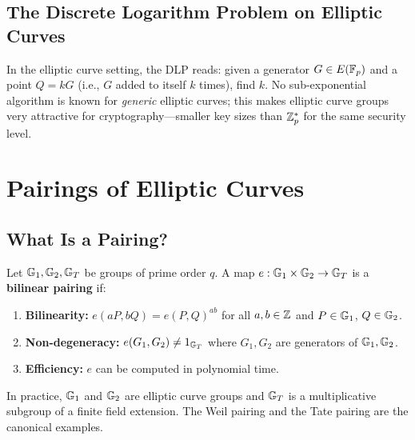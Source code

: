 \documentclass[11pt]{article}
\begin{document}
\subsection{The Discrete Logarithm Problem on Elliptic Curves}

In the elliptic curve setting, the DLP reads: given a generator
$G \in E(\mathbb{F}_p)$ and a point $Q = kG$ (i.e., $G$ added to itself $k$
times), find $k$.  No sub-exponential algorithm is known for
\emph{generic} elliptic curves; this makes elliptic curve groups very
attractive for cryptography---smaller key sizes than $\mathbb{Z}_p^*$ for the
same security level.

\section{Pairings of Elliptic Curves}

\subsection{What Is a Pairing?}

\begin{definition}
  Let $\mathbb{G}_1, \mathbb{G}_2, \mathbb{G}_T$ be groups of prime order $q$.  A map
  $e : \mathbb{G}_1 \times \mathbb{G}_2 \to \mathbb{G}_T$ is a \textbf{bilinear pairing} if:
  \begin{enumerate}[label=(\roman*)]
    \item \textbf{Bilinearity:} $e(aP, bQ) = e(P,Q)^{ab}$ for all
      $a, b \in \mathbb{Z}$ and $P \in \mathbb{G}_1$, $Q \in \mathbb{G}_2$.
    \item \textbf{Non-degeneracy:} $e(G_1, G_2) \neq 1_{\mathbb{G}_T}$ where
      $G_1, G_2$ are generators of $\mathbb{G}_1, \mathbb{G}_2$.
    \item \textbf{Efficiency:} $e$ can be computed in polynomial time.
  \end{enumerate}
\end{definition}

In practice, $\mathbb{G}_1$ and $\mathbb{G}_2$ are elliptic curve groups and $\mathbb{G}_T$
is a multiplicative subgroup of a finite field extension.  The Weil
pairing and the Tate pairing are the canonical examples.

\end{document}
